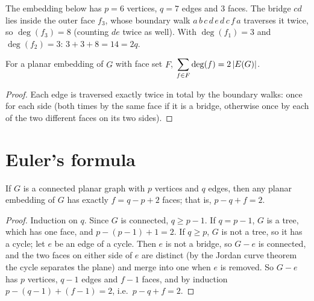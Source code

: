 \begin{example}
The embedding below has $p = 6$ vertices, $q = 7$ edges and $3$ faces. The bridge $cd$ lies inside
the outer face $f_3$, whose boundary walk $a\,b\,c\,d\,e\,d\,c\,f\,a$ traverses it twice, so
$\deg(f_3) = 8$ (counting $de$ twice as well). With $\deg(f_1) = 3$ and $\deg(f_2) = 3$:
$3 + 3 + 8 = 14 = 2q$.
\begin{center}
\end{center}
\end{example}

\begin{theorem}
For a planar embedding of $G$ with face set $F$, $\displaystyle\sum_{f\in F}\deg(f) = 2\left\lvert E(G) \right\rvert$.
\end{theorem}
\begin{proof}
Each edge is traversed exactly twice in total by the boundary walks: once for each side (both
times by the same face if it is a bridge, otherwise once by each of the two different faces on
its two sides).
\end{proof}

\section{Euler's formula}

\begin{theorem}
If $G$ is a connected planar graph with $p$ vertices and $q$ edges, then any planar embedding of
$G$ has exactly $f = q - p + 2$ faces; that is, $p - q + f = 2$.
\end{theorem}
\begin{proof}
Induction on $q$. Since $G$ is connected, $q \ge p - 1$. If $q = p - 1$, $G$ is a tree, which has
one face, and $p - (p-1) + 1 = 2$. If $q \ge p$, $G$ is not a tree, so it has a cycle; let $e$ be
an edge of a cycle. Then $e$ is not a bridge, so $G - e$ is connected, and the two faces on either
side of $e$ are distinct (by the Jordan curve theorem the cycle separates the plane) and merge into
one when $e$ is removed. So $G - e$ has $p$ vertices, $q - 1$ edges and $f - 1$ faces, and by
induction $p - (q-1) + (f-1) = 2$, i.e.\ $p - q + f = 2$.
\end{proof}

